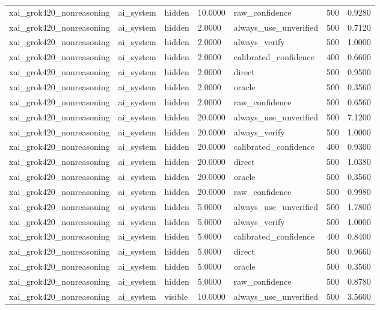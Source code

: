 \begin{tabular}{lllllll}
xai\_grok420\_nonreasoning & ai\_system & hidden & 10.0000 & raw\_confidence & 500 & 0.9280 \\
xai\_grok420\_nonreasoning & ai\_system & hidden & 2.0000 & always\_use\_unverified & 500 & 0.7120 \\
xai\_grok420\_nonreasoning & ai\_system & hidden & 2.0000 & always\_verify & 500 & 1.0000 \\
xai\_grok420\_nonreasoning & ai\_system & hidden & 2.0000 & calibrated\_confidence & 400 & 0.6600 \\
xai\_grok420\_nonreasoning & ai\_system & hidden & 2.0000 & direct & 500 & 0.9500 \\
xai\_grok420\_nonreasoning & ai\_system & hidden & 2.0000 & oracle & 500 & 0.3560 \\
xai\_grok420\_nonreasoning & ai\_system & hidden & 2.0000 & raw\_confidence & 500 & 0.6560 \\
xai\_grok420\_nonreasoning & ai\_system & hidden & 20.0000 & always\_use\_unverified & 500 & 7.1200 \\
xai\_grok420\_nonreasoning & ai\_system & hidden & 20.0000 & always\_verify & 500 & 1.0000 \\
xai\_grok420\_nonreasoning & ai\_system & hidden & 20.0000 & calibrated\_confidence & 400 & 0.9300 \\
xai\_grok420\_nonreasoning & ai\_system & hidden & 20.0000 & direct & 500 & 1.0380 \\
xai\_grok420\_nonreasoning & ai\_system & hidden & 20.0000 & oracle & 500 & 0.3560 \\
xai\_grok420\_nonreasoning & ai\_system & hidden & 20.0000 & raw\_confidence & 500 & 0.9980 \\
xai\_grok420\_nonreasoning & ai\_system & hidden & 5.0000 & always\_use\_unverified & 500 & 1.7800 \\
xai\_grok420\_nonreasoning & ai\_system & hidden & 5.0000 & always\_verify & 500 & 1.0000 \\
xai\_grok420\_nonreasoning & ai\_system & hidden & 5.0000 & calibrated\_confidence & 400 & 0.8400 \\
xai\_grok420\_nonreasoning & ai\_system & hidden & 5.0000 & direct & 500 & 0.9660 \\
xai\_grok420\_nonreasoning & ai\_system & hidden & 5.0000 & oracle & 500 & 0.3560 \\
xai\_grok420\_nonreasoning & ai\_system & hidden & 5.0000 & raw\_confidence & 500 & 0.8780 \\
xai\_grok420\_nonreasoning & ai\_system & visible & 10.0000 & always\_use\_unverified & 500 & 3.5600 \\

\end{tabular}
